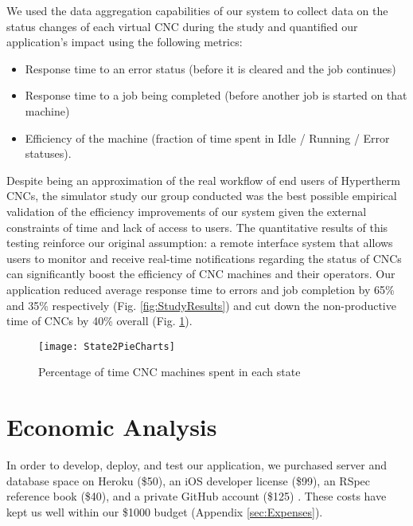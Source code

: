 \documentclass[12pt,letterpaper,titlepage]{article}
\newlength{\wideitemsep}
\let\olditem\item
\renewcommand{\item}{\setlength{\itemsep}{\wideitemsep}\olditem}
\begin{document}
We used the data aggregation capabilities of our system to collect data on the status changes of each virtual CNC during the study and quantified our application's impact using the following metrics:

\begin{itemize}
\item Response time to an error status (before it is cleared and the job continues)
\item Response time to a job being completed (before another job is started on that machine)
\item Efficiency of the machine (fraction of time spent in Idle / Running / Error statuses).
\end{itemize}

Despite being an approximation of the real workflow of end users of Hypertherm CNCs, the simulator study our group conducted was the best possible empirical validation of the efficiency improvements of our system given the external constraints of time and lack of access to users. The quantitative results of this testing reinforce our original assumption: a remote interface system that allows users to monitor and receive real-time notifications regarding the status of CNCs can significantly boost the efficiency of CNC machines and their operators. Our application reduced average response time to errors and job completion by 65\% and 35\% respectively (Fig. \ref{fig:StudyResults}) and cut down the non-productive time of CNCs by 40\% overall (Fig. \ref{fig:StatePieCharts}).

\begin{figure}[h]
	\begin{centering}
		\vspace{-10pt}
		\texttt{[image: State2PieCharts]}
		\vspace{-10pt}
		\caption{Percentage of time CNC machines spent in each state}
		\label{fig:StatePieCharts}
		\vspace{-15pt}
	\end{centering}
\end{figure}

\section{Economic Analysis} \label{sec:EconomicAnalysis}

In order to develop, deploy, and test our application, we purchased server and database space on Heroku (\$50),  an iOS developer license (\$99), an RSpec reference book (\$40), and a private GitHub account (\$125) \cite{iospricing,github pricing}. These costs have kept us well within our \$1000 budget (Appendix \ref{sec:Expenses}).
\end{document}
